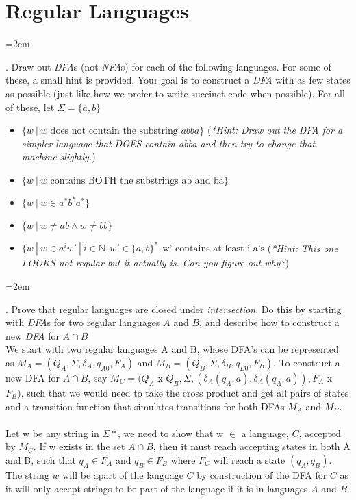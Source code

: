 \documentclass[12pt]{article}
\def\homework{Regular Languages}
\newcounter{quesnum}
\newcommand{\question}[2][??]{
\begin{list}{\labelitemi}{\leftmargin=2em}
\item [\arabic{quesnum}.] {} {#2}
\end{list}
\addtocounter{quesnum}{1}
}
\begin{document}
\section*{\homework}

\question[3]{
Draw out \emph{DFA}s (not \emph{NFA}s) for each of the following languages. For some of these, a small hint is provided. Your goal is to construct a \emph{DFA} with as few states as possible (just like how we prefer to write succinct code when possible). For all of these, let $\Sigma = \{a,b\}$
}

\begin{itemize}
	\item $\{w \ | \ w \text{ does not contain the substring } abba \}$ (\emph{*Hint: Draw out the DFA for a simpler language that DOES contain abba and then try to change that machine slightly.})
	\item $\{w \ | \ w \text{ contains BOTH the substrings ab and ba}\}$
	\item $\{w \ | \ w \in a^*b^*a^* \}$
	\item $\{w \ | \ w \neq ab \wedge w \neq bb \}$
	\item $\{w \ | \ w \in a^iw' \ | \ i \in \mathbb{N}, w' \in \{a,b\}^*, \text{w' contains at least i a's} $ (\emph{*Hint: This one LOOKS not regular but it actually is. Can you figure out why?})
\end{itemize}

\vspace{12pt}

\question[3]{
Prove that regular languages are closed under \emph{intersection}. Do this by starting with \emph{DFA}s for two regular languages $A$ and $B$, and describe how to construct a new \emph{DFA} for $A \cap B$\
\\

We start with two regular languages A and B, whose DFA's can be represented as $M_A = (Q_A, \Sigma, \delta_A, q_{A0}, F_A)$ and $M_B = (Q_B, \Sigma, \delta_B, q_{B0}, F_B)$. To construct a new DFA for $A \cap B$, say $M_C = (Q_A $ x $ Q_B, \Sigma, (\delta_A(q_A,a),\delta_A(q_A,a)) ,F_A $ x $ F_B)$, such that we would need to take the cross product and get all pairs of states and a transition function that simulates transitions for both DFAs $M_A $ and $ M_B$.\\
\\
Let w be any string in $\Sigma*$, we need to show that w $\in$ a language, $C$, accepted by $M_C$. If w exists in the set $A \cap B$, then it must reach accepting states in both A and B, such that $q_A \in F_A$ and $q_B \in F_B$ where $F_C$ will reach a state $(q_A, q_B)$. The string $w$ will be apart of the language $C$ by construction of the DFA for $C$ as it will only accept strings to be part of the language if it is in languages $A$ and $B$.
}
\end{document}
